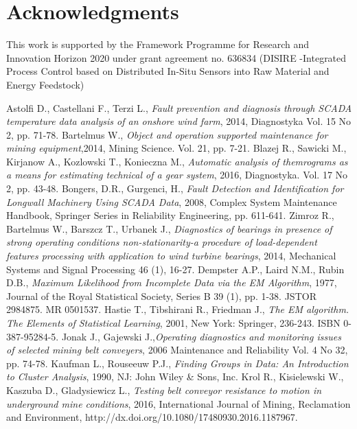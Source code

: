 \section{Acknowledgments}
This work is supported by the Framework Programme for Research and Innovation
Horizon 2020 under grant agreement no. 636834 (DISIRE -Integrated Process Control
based on Distributed In-Situ Sensors into Raw Material and Energy Feedstock)
\vspace{-15pt}
 \begin{thebibliography}{}
 Astolfi D., Castellani F., Terzi L., \emph{Fault prevention and diagnosis through SCADA temperature data analysis of an onshore wind farm}, 2014, Diagnostyka Vol. 15 No 2, pp. 71-78.
 Bartelmus W., \emph{Object and operation supported maintenance for mining equipment},2014, Mining Science. Vol. 21, pp. 7-21.
 Blazej R., Sawicki M., Kirjanow A., Kozlowski T., Konieczna M., \emph{Automatic analysis of themrograms as a means for estimating  technical of a gear system}, 2016, Diagnostyka. Vol. 17 No 2, pp. 43-48.
 Bongers, D.R., Gurgenci, H., \emph{Fault Detection and Identification for Longwall Machinery Using SCADA Data}, 2008, Complex System Maintenance Handbook, Springer Series in Reliability Engineering, pp. 611-641.
 Zimroz R., Bartelmus W., Barszcz T., Urbanek J., \emph{Diagnostics of bearings in presence of strong operating conditions non-stationarity-a procedure of load-dependent features processing with application to wind turbine bearings}, 2014, Mechanical Systems and Signal Processing 46 (1), 16-27.
 Dempster A.P., Laird N.M., Rubin D.B., \emph{Maximum Likelihood from Incomplete Data via the EM Algorithm}, 1977,  Journal of the Royal Statistical Society, Series B 39 (1), pp. 1-38. JSTOR 2984875. MR 0501537.
 Hastie T.,  Tibshirani R., Friedman J., \emph{The EM algorithm. The Elements of Statistical Learning}, 2001,  New York: Springer, 236-243. ISBN 0-387-95284-5.
  Jonak J., Gajewski J.,\emph{Operating diagnostics and monitoring issues of selected mining belt conveyers}, 2006 Maintenance and Reliability Vol. 4 No 32, pp. 74-78.
 Kaufman L., Rouseeuw P.J., \emph{Finding Groups in Data: An Introduction to Cluster Analysis}, 1990, NJ: John Wiley \& Sons, Inc.
 Krol R., Kisielewski W., Kaszuba D., Gladysiewicz L., \emph{Testing belt conveyor resistance to motion in underground mine conditions}, 2016, International Journal of Mining, Reclamation and Environment, http://dx.doi.org/10.1080/17480930.2016.1187967.

\end{thebibliography}
